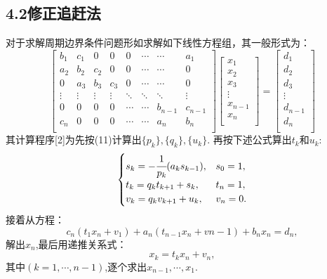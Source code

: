 \documentclass[12pt]{article}
\begin{document}
\subsection*{{\normalsize 4.2}\quad\normalsize\heiti 修正追赶法} 
对于求解周期边界条件问题形如求解如下线性方程组，其一般形式为：
$$
\left[ \begin{matrix}
b_{1} & c_{1} & 0 & 0 & 0 & \cdots & \cdots& a_{1}\\
a_{2} & b_{2} & c_{2} & 0 & 0 & \cdots & \cdots & 0\\
0 & a_{3} & b_{3} &c_{3} & 0 & \cdots & \cdots & 0\\
\vdots & \vdots & \vdots & \vdots & \ddots & \ddots & \ddots & \vdots\\
0 & 0 & 0 & 0 & \cdots & \cdots & b_{n-1} & c_{n-1}\\ 
c_{n} & 0 & 0 & 0 & \cdots & \cdots & a_{n} & b_{n}\\
\end{matrix} \right]
\left[ \begin{matrix} 
x_{1}\\
x_{2}\\
x_{3}\\
\vdots\\
x_{n-1}\\
x_{n}\\
\end{matrix} \right]
=
\left[ \begin{matrix}
d_{1}\\
d_{2}\\
d_{3}\\
\vdots\\
d_{n-1}\\
d_{n}\\
\end{matrix} \right]	
$$
其计算程序[2]为先按(11)计算出$\{p_{k}\},\{q_{k}\},\{u_{k}\}$. 再按下述公式算出$t_{k}和u_{k}$:
\begin{equation}\label{13}
\begin{cases}
	s_{k}=-\cfrac{1}{p_{k}}(a_{k}s_{k-1}), & s_{0}=1,\\
	t_{k}=q_{k}t_{k+1}+s_{k}, & t_{n}=1,\\
	v_{k}=q_{k}v_{k+1}+u_{k}, & v_{n}=0.\\
\end{cases}
\end{equation}
接着从方程：
\begin{equation}\label{14}
c_{n}(t_{1}x_{n}+v_{1})+a_{n}(t_{n-1}x_{n}+v{n-1})+b_{n}x_{n}=d_{n},
\end{equation}
解出$x_{n}$,最后用递推关系式：
\begin{equation}\label{15}
x_{k}=t_{k}x_{n}+v_{n}, 
\end{equation}
其中$(k=1,\cdots,n-1)$,逐个求出$x_{n-1},\cdots,x_{1}$.
\end{document}
